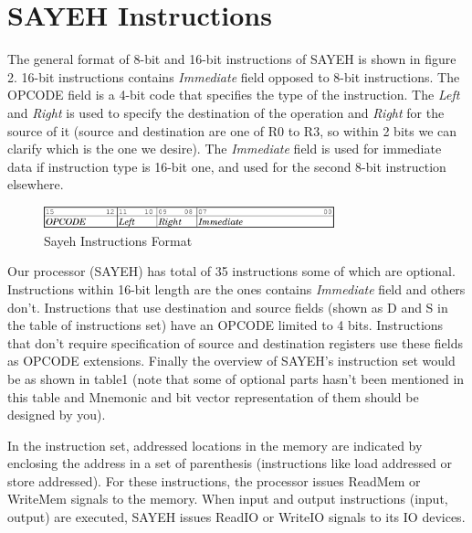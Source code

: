 \documentclass{report}
\begin{document}
\section{SAYEH Instructions}
The general format of 8-bit and 16-bit instructions of SAYEH is shown in figure 2. 16-bit 		instructions contains \textit{Immediate} field opposed to 8-bit instructions. The OPCODE field is 	a 4-bit code that specifies the type of the instruction. The \textit{Left} and \textit{Right} is used to 		specify the destination of the operation and \textit{Right} for the source of it (source and 		destination are one of R0 to R3, so within 2 bits we can clarify which is the one we 		desire). The \textit{Immediate} field is used for immediate data if instruction type is 16-bit one, and used for the second 8-bit instruction elsewhere.

\begin{figure}[ht]
	\centering
	\includegraphics[width=0.75\textwidth]{figs/fig2}
	\caption{Sayeh Instructions Format}
\end{figure}

\par
Our processor (SAYEH) has total of 35 instructions  some of which are optional. Instructions within 16-bit length are the ones contains \textit{Immediate} field and others don’t. Instructions that use destination and source fields (shown as D and S in the table of instructions set) have an OPCODE limited to 4 bits. Instructions that don’t require specification of source and destination registers use these fields as OPCODE extensions. Finally the overview of SAYEH’s instruction set would be as shown in table1 (note that some of optional parts hasn’t been mentioned in this table and Mnemonic and bit vector representation of them should be designed by you).
\par
In the instruction set, addressed locations in the memory are indicated by enclosing the address in a set of parenthesis (instructions like load addressed or store addressed). For these instructions, the processor issues ReadMem or WriteMem signals to the memory. When input and output instructions (input, output) are executed, SAYEH issues ReadIO or WriteIO signals to its IO devices.
\end{document}
